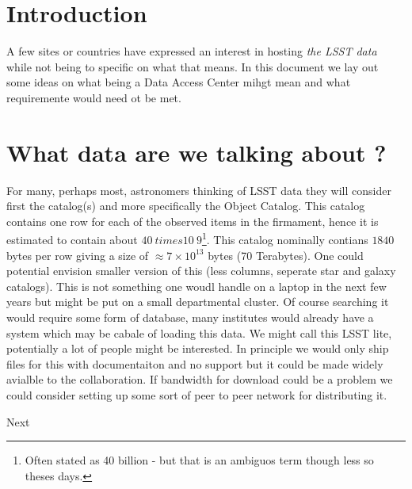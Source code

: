 \section{Introduction}

A few sites or countries have expressed an interest in hosting {\em the LSST data} while not being to specific on what that means.
In this document we lay out some ideas on what being a Data Access Center mihgt mean and what requiremente would need ot be met.


\section{What data are we talking about ?}

For many, perhaps most, astronomers thinking of LSST data they will consider first the catalog(s) and more specifically the Object Catalog.
This catalog contains one row for each of the observed items in the firmament, hence it is estimated to contain about $40 ~times 10~{9}$\footnote{Often stated as 40 billion - but that is an ambiguos term though less so theses days.}. This catalog nominally contians $1840$ bytes per row giving a size of $\approx 7 \times 10^{13}$ bytes (70 Terabytes). One could potential envision smaller version of this (less columns, seperate star and galaxy catalogs). This is not something one woudl handle on a laptop in the next few years but might be put on a small departmental cluster.
Of course searching it would require some form of database, many institutes would already have a system which may be cabale of loading this data.
We might call this LSST lite, potentially a lot of people might be interested. In principle we would only ship files for this with documentaiton and no support but it could be made widely avialble to the collaboration. If bandwidth for download could be a problem we could consider setting up some sort of peer to peer network for distributing it.

Next


